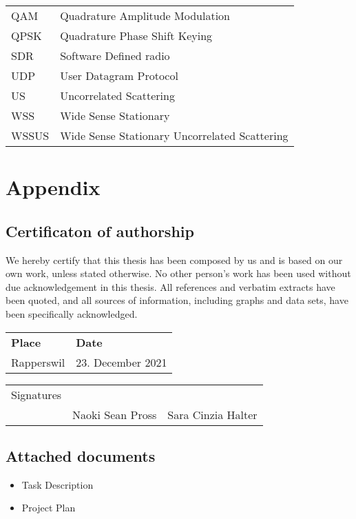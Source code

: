 \documentclass[
	overfullrule,
	paper = a4, twoside, openright, BCOR = 5mm,
	headinclude, footexclude,
	fontsize = 11pt,
	cleardoublepage = empty,
	titlepage, abstract = on,
	automark,
	numbers = noenddot
]{scrreprt}
\begin{document}
\begin{tabularx}{\linewidth}{l X}
		QAM    & Quadrature Amplitude Modulation                  \\
		QPSK   & Quadrature Phase Shift Keying                    \\
		SDR    & Software Defined radio                           \\
		UDP    & User Datagram Protocol                           \\
		US     & Uncorrelated Scattering                          \\
		WSS    & Wide Sense Stationary                            \\
		WSSUS  & Wide Sense Stationary Uncorrelated Scattering    \\
		\bottomrule
	\end{tabularx}

	\cleardoublepage

	\hypersetup{pageanchor = true}
	\setcounter{page}{1}
	\pagestyle{scrheadings}

	
	
	
	

	\printskelnotes
	\printbibliography

	\appendix
	\chapter{Appendix}

	\section{Certificaton of authorship}
	We hereby certify that this thesis has been composed by us and is based on our own work, unless stated otherwise. No other person's work has been used without due acknowledgement in this thesis. All references and verbatim extracts have been quoted, and all sources of information, including graphs and data sets, have been specifically acknowledged.

	\vspace{5mm}
	\begin{tabular}{ ll }
		\bfseries Place & \bfseries Date \\
		Rapperswil & 23. December 2021
	\end{tabular}
	\vspace{1cm}
	\begin{flushright}
		\begin{tabularx}{\linewidth}{ rXX }
			Signatures
				& \hrulefill & \hrulefill \\
				& Naoki Sean Pross & Sara Cinzia Halter \\
		\end{tabularx}
	\end{flushright}
	\vspace{2cm}

  \section{Attached documents}
	\begin{itemize}
		\item Task Description
		\item Project Plan
	\end{itemize}
\end{document}
